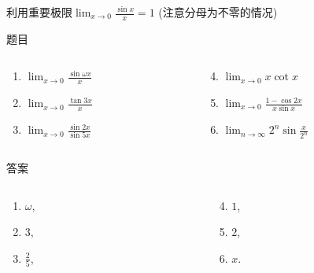 \documentclass[
10pt,
aspectratio=43,
]{beamer}
\begin{document}
\begin{frame}{利用重要极限$\displaystyle\lim_{x\to0}\frac{\sin x}{x}=1$ (注意分母为不零的情况)}
	\begin{block}{题目}
		\begin{columns}[onlytextwidth]
			\begin{column}{0.5\textwidth}
				\begin{enumerate}
					\item $\displaystyle\lim _{x \rightarrow 0} \frac{\sin \omega x}{x}$
					\item $\displaystyle\lim _{x \rightarrow 0} \frac{\tan 3 x}{x}$
					\item $\displaystyle\lim _{x \rightarrow 0} \frac{\sin 2 x}{\sin 5 x}$
				\end{enumerate}
			\end{column}
			\begin{column}{0.5\textwidth}
				\begin{enumerate}
					\setcounter{enumi}{3}
					\item $\displaystyle\lim _{x \rightarrow 0} x \cot x$
					\item $\displaystyle\lim _{x \rightarrow 0} \frac{1-\cos 2 x}{x \sin x}$
					\item $\displaystyle\lim _{n \rightarrow \infty} 2^n \sin \frac{x}{2^n}$
				\end{enumerate}
			\end{column}
		\end{columns}
	\end{block}
	\begin{exampleblock}{答案}
		\begin{columns}[onlytextwidth]
			\begin{column}{0.5\textwidth}
				\begin{enumerate}
					\item $\omega$,
					      \pause
					\item $3$,
					      \pause
					\item $\displaystyle\frac{2}{5}$,
				\end{enumerate}
			\end{column}
			\begin{column}{0.5\textwidth}
				\begin{enumerate}
					\setcounter{enumi}{3}
					\pause
					\item $1$,
					      \pause
					\item $2$,
					      \pause
					\item $x$.
				\end{enumerate}
			\end{column}
		\end{columns}
	\end{exampleblock}
\end{frame}
\end{document}
